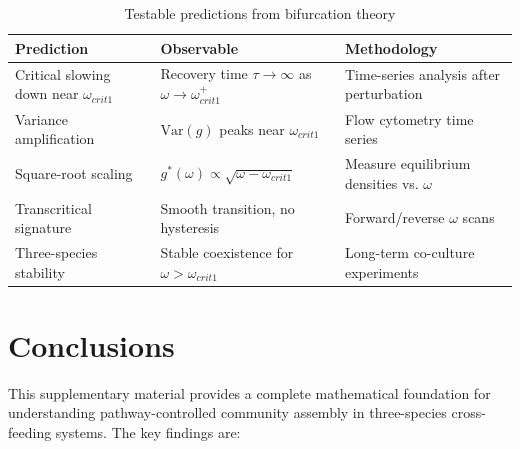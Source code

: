 \documentclass[11pt]{article}
\begin{document}
\begin{table}[h]
\centering
\small
\begin{tabular}{p{3cm}p{4cm}p{5cm}}
\toprule
\textbf{Prediction} & \textbf{Observable} & \textbf{Methodology} \\
\midrule
Critical slowing down near $\omega_{crit1}$ & Recovery time $\tau \to \infty$ as $\omega \to \omega_{crit1}^+$ & Time-series analysis after perturbation \\[0.5em]
Variance amplification & $\text{Var}(g)$ peaks near $\omega_{crit1}$ & Flow cytometry time series \\[0.5em]
Square-root scaling & $g^*(\omega) \propto \sqrt{\omega - \omega_{crit1}}$ & Measure equilibrium densities vs. $\omega$ \\[0.5em]
Transcritical signature & Smooth transition, no hysteresis & Forward/reverse $\omega$ scans \\[0.5em]
Three-species stability & Stable coexistence for $\omega > \omega_{crit1}$ & Long-term co-culture experiments \\
\bottomrule
\end{tabular}
\caption{Testable predictions from bifurcation theory}
\end{table}

\section{Conclusions}

This supplementary material provides a complete mathematical foundation for understanding pathway-controlled community assembly in three-species cross-feeding systems. The key findings are:
\end{document}
